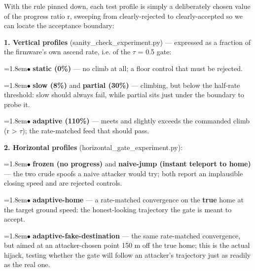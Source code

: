 \documentclass[11pt]{article}
\begin{document}
With the rule pinned down, each test profile is simply a deliberately chosen value of the progress ratio r, sweeping from clearly-rejected to clearly-accepted so we can locate the acceptance boundary:

\textbf{1. Vertical profiles} (sanity\_\allowbreak{}check\_\allowbreak{}experiment.py) — expressed as a fraction of the firmware's own ascend rate, i.e. of the $\tau$ = 0.5 gate:
\par\hangindent=1.8em\hspace*{1.2em}$\bullet$  \textbf{static (0\%)} — no climb at all; a floor control that must be rejected.
\par\hangindent=1.8em\hspace*{1.2em}$\bullet$  \textbf{slow (8\%)} and \textbf{partial (30\%)} — climbing, but below the half-rate threshold: slow should always fail, while partial sits just under the boundary to probe it.
\par\hangindent=1.8em\hspace*{1.2em}$\bullet$  \textbf{adaptive (110\%)} — meets and slightly exceeds the commanded climb (r > $\tau$); the rate-matched feed that should pass.

\textbf{2. Horizontal profiles} (horizontal\_\allowbreak{}gate\_\allowbreak{}experiment.py):
\par\hangindent=1.8em\hspace*{1.2em}$\bullet$  \textbf{frozen (no progress)} and \textbf{naive-jump (instant teleport to home)} — the two crude spoofs a naive attacker would try; both report an implausible closing speed and are rejected controls.
\par\hangindent=1.8em\hspace*{1.2em}$\bullet$  \textbf{adaptive-home} — a rate-matched convergence on the \textbf{true} home at the target ground speed: the honest-looking trajectory the gate is meant to accept.
\par\hangindent=1.8em\hspace*{1.2em}$\bullet$  \textbf{adaptive-fake-destination} — the same rate-matched convergence, but aimed at an attacker-chosen point 150 m off the true home; this is the actual hijack, testing whether the gate will follow an attacker's trajectory just as readily as the real one.
\end{document}
